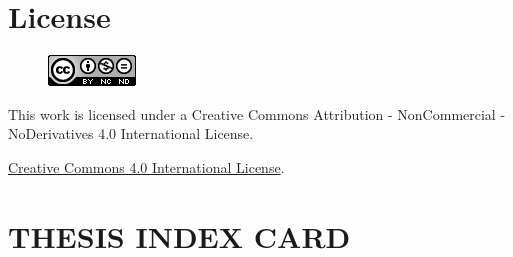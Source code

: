 \setcounter{page}{1} 
\pagestyle{plain}

\chapter*{License}



\vspace{1cm}

\begin{figure}[ht]
    \centering
	\includegraphics[scale=1]{../images/license_int.png}
\end{figure}

This work is licensed under a Creative Commons Attribution - NonCommercial - NoDerivatives 4.0 International License.

\href{https://creativecommons.org/licenses/by-nc-nd/4.0/}{Creative Commons 4.0 International License}.



\chapter*{THESIS INDEX CARD}

